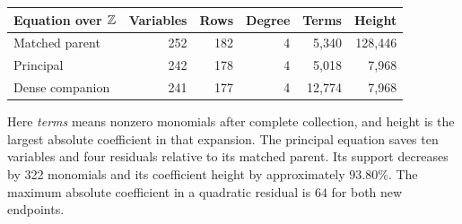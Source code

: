 \begin{center}\small
\setlength{\tabcolsep}{5pt}
\begin{tabular}{lrrrrr}
\toprule
Equation over $\mathbb Z$ & Variables & Rows & Degree & Terms & Height\\
\midrule
Matched parent & 252 & 182 & 4 & 5,340 & 128,446\\
Principal & 242 & 178 & 4 & 5,018 & 7,968\\
Dense companion & 241 & 177 & 4 & 12,774 & 7,968\\
\bottomrule
\end{tabular}
\end{center}
Here \emph{terms} means nonzero monomials after complete collection,
and height is the largest absolute coefficient in that expansion.
The principal equation saves ten variables and four residuals relative
to its matched parent. Its support decreases by 322 monomials and its
coefficient height by approximately $93.80\%$.
The maximum absolute coefficient in a quadratic residual is $64$
for both new endpoints.
